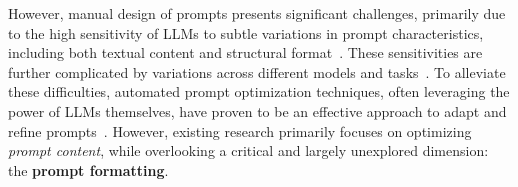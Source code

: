 However, manual design of prompts presents significant challenges, primarily due to the high sensitivity of LLMs to subtle variations in prompt characteristics, including both textual content and structural format~\citep{Jiang2022promptMaker, chi2023JohnnyPrompt, salinas2024butterflyeffectalteringprompts}. These sensitivities are further complicated by variations across different models and tasks~\cite{zhuo2024prosaassessingunderstandingprompt, C_2024ICLR_formatspread}. To alleviate these difficulties, automated prompt optimization techniques, often leveraging the power of LLMs themselves, have proven to be an effective approach to adapt and refine prompts~\cite{C_2023EMNLP_APO, C_2024EMNLP_sammo, C_2024ICLR_LLMasOPT}. However, existing research primarily focuses on optimizing \textit{prompt content}, while overlooking a critical and largely unexplored dimension: the \textbf{prompt formatting}.

